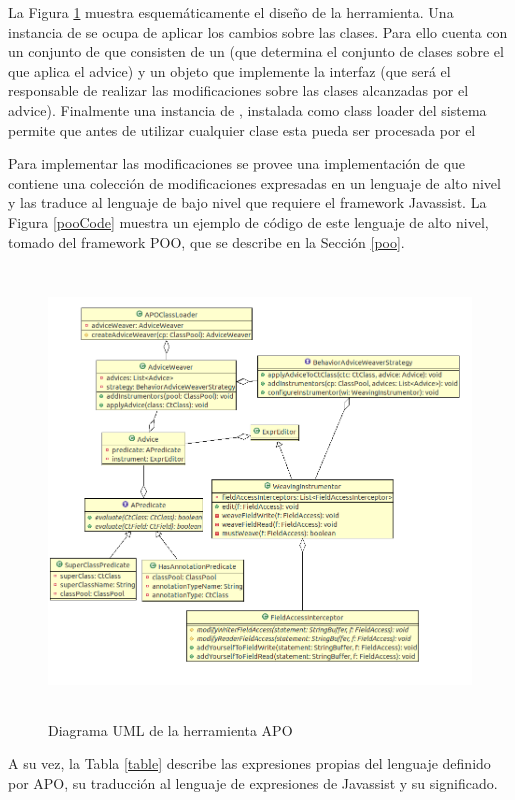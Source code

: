 		La Figura \ref{aopImage} muestra esquemáticamente el diseño de la herramienta.
		Una instancia de  se ocupa de aplicar los cambios sobre las
		clases.
		Para ello cuenta con un conjunto de  que consisten de un
		 (que determina el conjunto de clases sobre el que aplica el
		advice) y un objeto que implemente la interfaz  (que
		será el responsable de realizar las modificaciones sobre
		las clases alcanzadas por el advice).
		Finalmente una instancia de , instalada como class loader
		del sistema permite que antes de utilizar cualquier clase esta pueda ser procesada por el 
		
		Para implementar las modificaciones se provee una implementación de
		 que contiene una colección de modificaciones expresadas en un
		lenguaje de alto nivel y las traduce al lenguaje de bajo nivel que requiere el
		framework Javassist.
		La Figura \ref{pooCode} muestra un ejemplo de código de este lenguaje de alto nivel,
		tomado del framework POO, que se describe en la Sección \ref{poo}.
		
		\begin{figure}[h]
			\centering
			\includegraphics[width=450px, height=450px]{img/aop}
			\caption{Diagrama UML de la herramienta APO}
			\label{aopImage}
		\end{figure}	 
		
		
		A su vez, la Tabla \ref{table} describe las expresiones propias del lenguaje
		definido por APO, su traducción al lenguaje de expresiones de
		Javassist y su significado.
		
